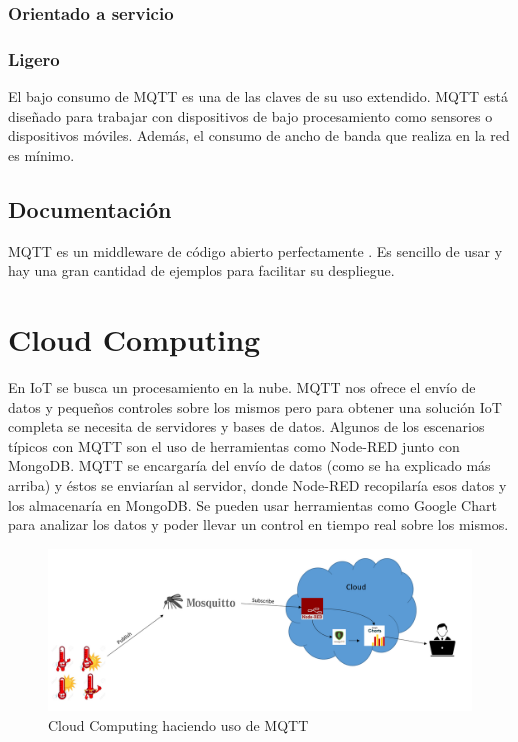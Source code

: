 \documentclass[12pt, twoside]{book}
\newcommand{\MYhref}[3][blue]{\href{#2}{\color{#1}{#3}}}
\begin{document}
\subsubsection*{Orientado a servicio}

\subsubsection*{Ligero}
El bajo consumo de MQTT es una de las claves de su uso extendido. MQTT está diseñado para trabajar con dispositivos de bajo procesamiento como sensores o dispositivos móviles. Además, el consumo de ancho de banda que realiza en la red es mínimo. 

\subsection{Documentación}
MQTT es un middleware de código abierto perfectamente
\MYhref{http://docs.oasis-open.org/mqtt/mqtt/v3.1.1/mqtt-v3.1.1.html}{documentado}. Es sencillo de usar y hay una gran cantidad de ejemplos para facilitar su despliegue.\\

 
\section{Cloud Computing}
En IoT se busca un procesamiento en la nube. MQTT nos ofrece el envío de datos y pequeños controles sobre los mismos pero para obtener una solución IoT completa se necesita de servidores y bases de datos. Algunos de los escenarios típicos con MQTT son el uso de herramientas como Node-RED\cite{nodered} junto con MongoDB\cite{mongo}. MQTT se encargaría del envío de datos (como se ha explicado más arriba) y éstos se enviarían al servidor, donde Node-RED recopilaría esos datos y los almacenaría en MongoDB. Se pueden usar herramientas como Google Chart para analizar los datos y poder llevar un control en tiempo real sobre los mismos. 
\begin{figure}[H]
\centering
\includegraphics[scale=0.4]{images/cloud_mqtt1}
\caption{Cloud Computing haciendo uso de MQTT}\label{L408}
\end{figure}
\end{document}

